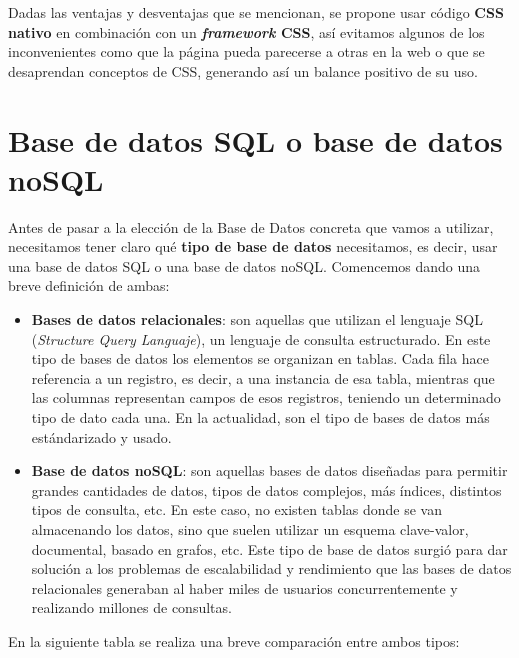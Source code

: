 Dadas las ventajas y desventajas que se mencionan, se propone usar código \textbf{CSS nativo}
en combinación con un \textbf{\textit{framework} CSS}, así evitamos algunos de los
inconvenientes como que la página pueda parecerse a otras en la web o que se desaprendan
conceptos de CSS, generando así un balance positivo de su uso.

\section{Base de datos SQL o base de datos noSQL} \label{sec:sql-nosql}
Antes de pasar a la elección de la Base de Datos concreta que vamos a utilizar, necesitamos
tener claro qué \textbf{tipo de base de datos} necesitamos, es decir, usar una base de datos
SQL o una base de datos noSQL. Comencemos dando una breve definición de ambas:
    
    \begin{itemize}
        \item \textbf{Bases de datos relacionales}: son aquellas que utilizan el lenguaje
        SQL (\textit{Structure Query Languaje}), un lenguaje de consulta estructurado. En
        este tipo de bases de datos los elementos se organizan en tablas. Cada fila hace
        referencia a un registro, es decir, a una instancia de esa tabla, mientras que las
        columnas representan campos de esos registros, teniendo un determinado tipo de dato
        cada una. En la actualidad, son el tipo de bases de datos más estándarizado y usado.
        \item \textbf{Base de datos noSQL}: son aquellas bases de datos diseñadas para
        permitir grandes cantidades de datos, tipos de datos complejos, más índices,
        distintos tipos de consulta, etc. En este caso, no existen tablas donde se van
        almacenando los datos, sino que suelen utilizar un esquema clave-valor, documental,
        basado en grafos, etc. Este tipo de base de datos surgió para dar solución a los
        problemas de escalabilidad y rendimiento que las bases de datos relacionales
        generaban al haber miles de usuarios concurrentemente y realizando millones de
        consultas.
    \end{itemize}

En la siguiente tabla se realiza una breve comparación entre ambos tipos: 


